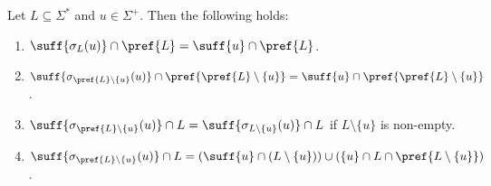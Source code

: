 \begin{proposition} \label{constrsync:prop:suffsigmaB}
	Let $L \subseteq \Sigma^*$ and $u \in \Sigma^+$. Then the following holds:
	\begin{enumerate}
		\item \label{constrsync:prop:suffsigma:1B} $\suff{\sigma_L(u)} \cap \pref{L} = \suff{u}\cap \pref{L}$.
		
		\item \label{constrsync:prop:suffsigma:B4} $\suff{\sigma_{\pref{L}\setminus\{u\}}(u)} \cap \pref{\pref{L} \setminus\{u\}}
		=
		\suff{u} \cap \pref{\pref{L} \setminus \{u\}}$.
		
		\item \label{constrsync:prop:suffsigma:2B} $\suff{\sigma_{\pref{L}\setminus\{u\}}(u)} \cap L = \suff{\sigma_{L\setminus \{u\}}(u)} \cap L$ if $L \setminus \{u\}$ is non-empty.
				
		\item \label{constrsync:prop:suffsigma:3B} $\suff{\sigma_{\pref{L}\setminus \{u\}}(u)} \cap L = ( \suff{u}  \cap ( L \setminus \{u\} ) ) \cup( \{u\} \cap L \cap \pref{L\setminus\{u\}} )$.
	\end{enumerate}
\end{proposition}
